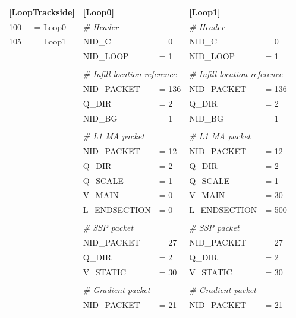 \documentclass{template/openetcs}
\begin{document}
	\begin{tabular}{|l l l l l l|}
	
		\hline
		
		\multicolumn{2}{|l}{ \begin{minipage}[t]{0.33\linewidth} \textbf{[LoopTrackside]} \end{minipage} } & \multicolumn{2}{l}{ \begin{minipage}[t]{0.33\linewidth} \textbf{[Loop0]} \end{minipage} } & \multicolumn{2}{l|}{ \begin{minipage}[t]{0.33\linewidth} \textbf{[Loop1]} \end{minipage} } \\ 
		100  &= Loop0 & \multicolumn{2}{l}{\emph{\# Header}} & \multicolumn{2}{l|}{\emph{\# Header}} \\ 
		105  &= Loop1 & NID\_C  &= 0 & NID\_C &= 0 \\
		& & NID\_LOOP  &= 1 & NID\_LOOP  &= 1 \\
		& & & & & \\
		& & \multicolumn{2}{l}{\emph{\# Infill location reference}} & \multicolumn{2}{l|}{\emph{\# Infill location reference}} \\ 
		& & NID\_PACKET &= 136 & NID\_PACKET &= 136 \\
		& & Q\_DIR &= 2 & Q\_DIR &= 2 \\
		& & NID\_BG &= 1 & NID\_BG &= 1 \\
		& & & & & \\
		& & \multicolumn{2}{l}{\emph{\# L1 MA packet}} & \multicolumn{2}{l|}{\emph{\# L1 MA packet}}  \\
		& & NID\_PACKET &= 12 & NID\_PACKET &= 12 \\
		& & Q\_DIR &= 2 & Q\_DIR &= 2 \\
		& & Q\_SCALE &= 1 & Q\_SCALE &= 1 \\
		& & V\_MAIN	&= 0 & V\_MAIN &= 30 \\
		& & L\_ENDSECTION &= 0 & L\_ENDSECTION &= 500 \\
		& & & & & \\
		& & \multicolumn{2}{l}{\emph{\# SSP packet}} & \multicolumn{2}{l|}{\emph{\# SSP packet}}  \\
		& & NID\_PACKET &= 27 & NID\_PACKET &= 27 \\
		& & Q\_DIR &= 2 & Q\_DIR &= 2 \\
		& & V\_STATIC &= 30 & V\_STATIC &= 30 \\
		& & & & & \\
		& & \multicolumn{2}{l}{\emph{\# Gradient packet}} & \multicolumn{2}{l|}{\emph{\# Gradient packet}}  \\
		& & NID\_PACKET &= 21 & NID\_PACKET &= 21 \\ 
		
		\hline
		
	\end{tabular}
\end{document}
